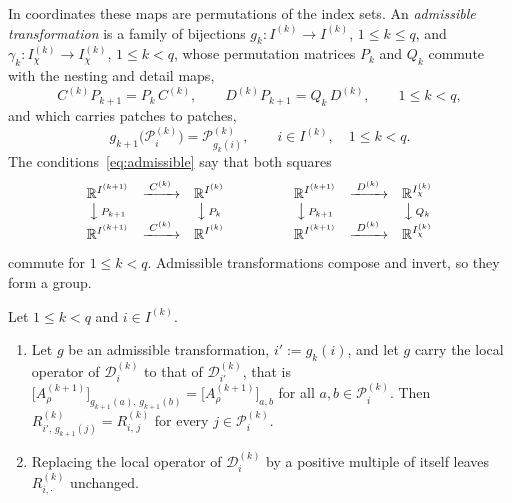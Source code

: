 \documentclass[hidelinks]{siamart}
\theoremstyle{nonumberplain}
\numberwithin{theorem}{section}
\begin{document}
In coordinates these maps are permutations of the index sets.  An
\emph{admissible
transformation} is a family of bijections
$g_k \colon I^{(k)} \to I^{(k)}$, $1 \leq k \leq q$, and
$\gamma_k \colon I^{(k)}_\chi \to I^{(k)}_\chi$, $1 \leq k < q$, whose
permutation matrices $P_k$ and $Q_k$ commute with the nesting and detail
maps,
\begin{equation}\label{eq:admissible}
  C^{(k)} P_{k+1} = P_k\, C^{(k)},
  \qquad
  D^{(k)} P_{k+1} = Q_k\, D^{(k)},
  \qquad 1 \leq k < q ,
\end{equation}
and which carries patches to patches,
\begin{equation}\label{eq:patch_equivariance}
  g_{k+1}\bigl(\mathcal{P}^{(k)}_i\bigr) = \mathcal{P}^{(k)}_{g_k(i)},
  \qquad i \in I^{(k)}, \quad 1 \leq k < q .
\end{equation}
The conditions~\eqref{eq:admissible} say that both squares
\[
  \begin{array}{ccc}
    \mathbb{R}^{I^{(k+1)}} & \xrightarrow{\;C^{(k)}\;} & \mathbb{R}^{I^{(k)}} \\
    \big\downarrow\,{\scriptstyle P_{k+1}} & &
      \big\downarrow\,{\scriptstyle P_{k}} \\
    \mathbb{R}^{I^{(k+1)}} & \xrightarrow{\;C^{(k)}\;} & \mathbb{R}^{I^{(k)}}
  \end{array}
  \qquad\qquad
  \begin{array}{ccc}
    \mathbb{R}^{I^{(k+1)}} & \xrightarrow{\;D^{(k)}\;} &
      \mathbb{R}^{I^{(k)}_\chi} \\
    \big\downarrow\,{\scriptstyle P_{k+1}} & &
      \big\downarrow\,{\scriptstyle Q_{k}} \\
    \mathbb{R}^{I^{(k+1)}} & \xrightarrow{\;D^{(k)}\;} &
      \mathbb{R}^{I^{(k)}_\chi}
  \end{array}
\]
commute for $1 \leq k < q$.  Admissible transformations compose and
invert, so they form a group.

\begin{proposition}\label{prop:orbit_transport}
Let $1 \leq k < q$ and $i \in I^{(k)}$.
\begin{enumerate}
  \item[(i)] Let $g$ be an admissible transformation, $i' := g_k(i)$, and
    let $g$ carry the local operator of $\mathcal{D}^{(k)}_i$ to that of
    $\mathcal{D}^{(k)}_{i'}$, that is
    $\bigl[A^{(k+1)}_\rho\bigr]_{g_{k+1}(a),\, g_{k+1}(b)}
     = \bigl[A^{(k+1)}_\rho\bigr]_{a,b}$ for all
    $a, b \in \mathcal{P}^{(k)}_i$.  Then
    $R^{(k)}_{i',\, g_{k+1}(j)} = R^{(k)}_{i,\, j}$ for every
    $j \in \mathcal{P}^{(k)}_i$.
  \item[(ii)] Replacing the local operator of $\mathcal{D}^{(k)}_i$ by a
    positive multiple of itself leaves $R^{(k)}_{i,\cdot}$ unchanged.
\end{enumerate}
\end{proposition}
\end{document}

